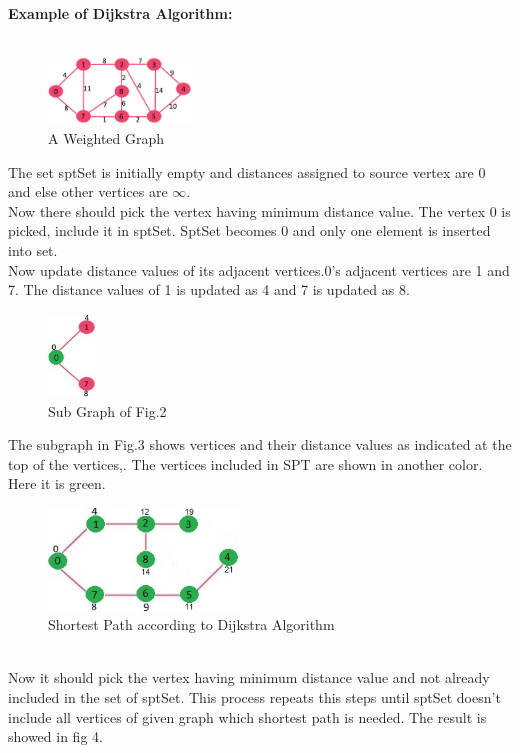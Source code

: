\documentclass[a4paper,10pt]{article}
\begin{document}
\textbf{Example of Dijkstra Algorithm:}\\\\

 \begin{figure}[h]
 \centering
  \includegraphics[width=1.5in]{dijfiga.png}
    \caption{A Weighted Graph~\cite{re5}}
  \label{fig:dij fig a}
\end{figure}
The set sptSet is initially empty and distances assigned to source vertex are 0 and else other vertices are $\infty$.\\
\hfill
 Now there should pick the vertex having minimum distance value. The vertex 0 is picked, include it in sptSet. SptSet becomes {0} and only one element is inserted into set.\\
Now update distance values of its adjacent vertices.0’s adjacent vertices are 1 and 7. The distance values of 1 is updated as 4 and 7 is updated as 8.~\cite{re5}\\
 \begin{figure}[h]
 \centering
  \includegraphics[width=0.5in]{dijfigb.png}
    \caption{Sub Graph of Fig.2~\cite{re5}}
  \label{fig:dij fig b}
\end{figure}
The subgraph in Fig.3 shows vertices and their distance values as indicated at the top of the vertices,. The vertices included in SPT are shown in another color. Here it is green.\\
\begin{figure}[h]
 \centering
  \includegraphics[width=2.0in]{dijfigf.png}
    \caption{Shortest Path according to Dijkstra Algorithm~\cite{re5}}
  \label{fig:dij fig f}
\end{figure}
\\Now it should pick the vertex having minimum distance value and not already included in the set of sptSet. This process repeats this steps until sptSet doesn’t include all vertices of given graph which shortest path is needed. The result is showed in fig 4.
\end{document}
